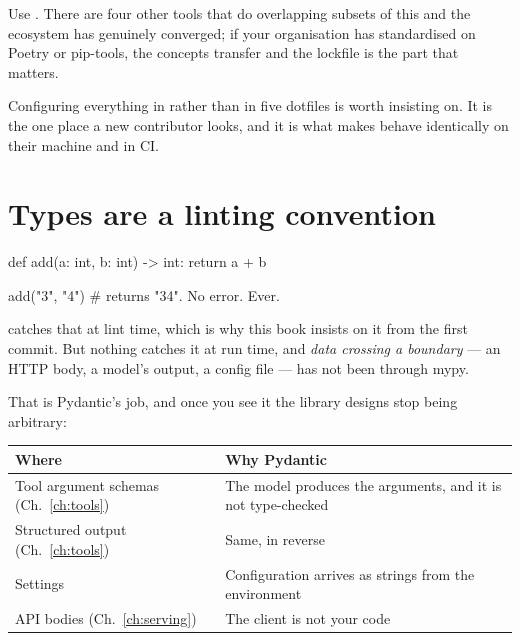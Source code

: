 Use . There are four other tools that do overlapping subsets of this and
the ecosystem has genuinely converged; if your organisation has standardised on
Poetry or pip-tools, the concepts transfer and the lockfile is the part that
matters.

\begin{note}
Configuring everything in  rather than in five dotfiles is
worth insisting on. It is the one place a new contributor looks, and it is what
makes  behave identically on their machine and in CI.
\end{note}

\section{Types are a linting convention}
\label{sec:typing}

\begin{python}[caption={This runs, and prints 7}, label={lst:no-runtime-types}]
def add(a: int, b: int) -> int:
    return a + b


add("3", "4")        # returns "34". No error. Ever.
\end{python}


 catches that at lint time, which is why this book insists on
it from the first commit. But nothing catches it at run time, and \emph{data
crossing a boundary} --- an HTTP body, a model's output, a config file --- has not
been through mypy.

That is Pydantic's job, and once you see it the library designs stop being
arbitrary:

\begin{center}
\small
\begin{tabularx}{\linewidth}{@{}lX@{}}
\toprule
\textbf{Where} & \textbf{Why Pydantic} \\
\midrule
Tool argument schemas (Ch.~\ref{ch:tools}) & The model produces the arguments,
  and it is not type-checked \\[3pt]
Structured output (Ch.~\ref{ch:tools}) & Same, in reverse \\[3pt]
Settings & Configuration arrives as strings from the environment \\[3pt]
API bodies (Ch.~\ref{ch:serving}) & The client is not your code \\
\bottomrule
\end{tabularx}
\end{center}

